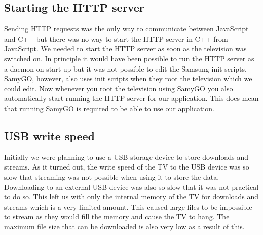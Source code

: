 \subsection{Starting the HTTP server}

Sending HTTP requests was the only way to communicate between JavaScript and C++ but there 
was no way to start the HTTP server in C++ from JavaScript. We needed to start the HTTP 
server as soon as the television was switched on. In principle it would have been possible 
to run the HTTP server as a daemon on start-up but it was not possible to edit the Samsung 
init scripts. SamyGO, however, also uses init scripts when they root the television which 
we could edit. Now whenever you root the television using SamyGO you also automatically 
start running the HTTP server for our application. This does mean that running SamyGO is 
required to be able to use our application.

\subsection{USB write speed}

Initially we were planning to use a USB storage device to store downloads and streams. 
As it turned out, the write speed of the TV to the USB device was so slow that streaming 
was not possible when using it to store the data. Downloading to an external USB device was 
also so slow that it was not practical to do so. This left us with only the internal 
memory of the TV for downloads and streams which is a very limited amount. This caused 
large files to be impossible to stream as they would fill the memory and cause the TV to 
hang. The maximum file size that can be downloaded is also very low as a result of this.

